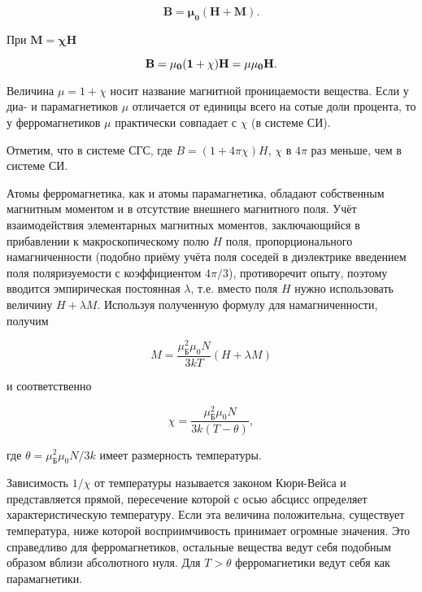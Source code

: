 \begin{equation*}
	\mathbf{B = \mu_0 (H + M)}.
\end{equation*}

При $\mathbf{M = \chi H}$

\begin{equation}
	\eqmark[]
	\mathbf{B = \mu_0 (1 + \chi)H = \mu \mu_0 H}.
\end{equation}

Величина $\mu = 1+ \chi$ носит название магнитной проницаемости вещества. Если у диа- и парамагнетиков $\mu$ отличается от единицы всего на сотые доли процента, то у ферромагнетиков $\mu$ практически совпадает с $\chi$ (в системе СИ).

Отметим, что в системе СГС, где $B = (1 + 4\pi \chi) H$, $\chi$ в $4\pi$ раз меньше, чем в системе СИ.

Атомы ферромагнетика, как и атомы парамагнетика, обладают собственным магнитным моментом и в отсутствие внешнего магнитного поля. Учёт взаимодействия  элементарных магнитных моментов, заключающийся в прибавлении к макроскопическому полю $H$ поля, пропорционального намагниченности (подобно приёму учёта поля соседей в диэлектрике введением поля поляризуемости с коэффициентом $4\pi/3$), противоречит опыту, поэтому вводится эмпирическая постоянная $\lambda$, т.е. вместо поля $H$ нужно использовать величину $H + \lambda M$.  Используя полученную формулу для намагниченности, получим

\begin{equation*}
	M = \frac{\mu_{\text{Б}}^2 \mu_0 N}{3kT}(H + \lambda M)
\end{equation*}

и соответственно

\begin{equation*}
	\chi = \frac{\mu_{\text{Б}}^2 \mu_0 N}{3k(T - \theta)},
\end{equation*}

где $\theta = \mu_{\text{Б}}^2 \mu_0 N / 3k$ имеет размерность температуры.

Зависимость  $1/\chi$  от температуры называется законом Кюри-Вейса и представляется прямой, пересечение которой с осью абсцисс определяет характеристическую температуру. Если эта величина положительна, существует температура, ниже которой восприимчивость принимает огромные значения. Это справедливо для ферромагнетиков, остальные вещества ведут себя подобным образом  вблизи абсолютного нуля. Для $T>\theta$ ферромагнетики ведут себя как парамагнетики.

